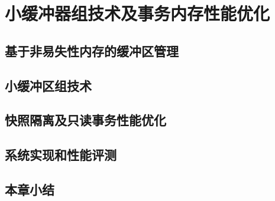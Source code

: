 \chapter{小缓冲器组技术及事务内存性能优化}
\label{chap:sba}

\section{基于非易失性内存的缓冲区管理}

\section{小缓冲区组技术}

\section{快照隔离及只读事务性能优化}

\section{系统实现和性能评测}

\section{本章小结}

